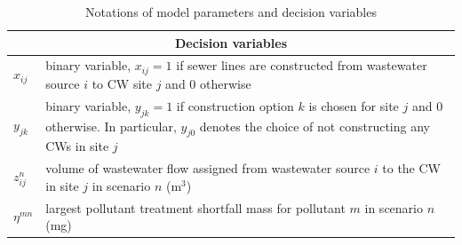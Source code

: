 \documentclass[preprint,12pt,authoryear]{elsarticle}
\begin{document}
\begin{table}[!htpb]
	\setlength{\extrarowheight}{1.5mm}
	\caption{Notations of model parameters and decision variables}
	\begin{tabular}{|p{1.5cm} p{16cm}|}
		\hline
		\multicolumn{2}{|c|}{Decision variables}\\
		\hline	
		$x_{ij}$ & binary variable, $x_{ij}=1$ if sewer lines are constructed from wastewater source $i$ to CW site $j$ and $0$ otherwise\\
		$y_{jk}$ & binary variable, $y_{jk}=1$ if construction option $k$ is chosen for site $j$ and $0$ otherwise. In particular, $y_{j0}$ denotes the choice of not constructing any CWs in site $j$\\
		$z_{ij}^n$ & volume of wastewater flow assigned from wastewater source $i$ to the CW in site $j$ in scenario $n$  (m$^3$)\\
		$\eta^{mn}$ & largest pollutant treatment shortfall mass for pollutant $m$ in scenario $n$ (mg)\\
		\hline	
	\end{tabular}

	\label{table:modelparameters2}
\end{table}
\end{document}

